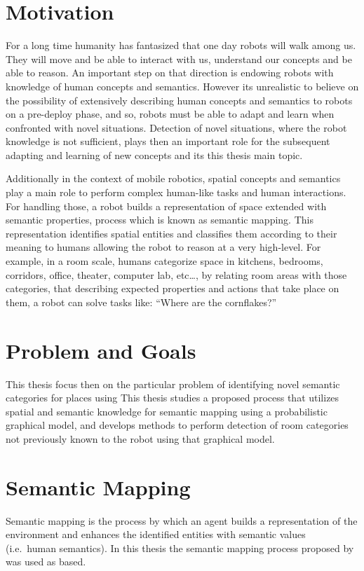 \documentclass[9pt,a4paper]{extarticle}
\begin{document}
\begin{multicols}{2}

\section{Motivation}
For a long time humanity has fantasized that one day robots will walk among us.
They will move and be able to interact with us, understand our concepts and
be able to reason.
An important step on that direction is endowing robots with knowledge of human concepts and
semantics. However its unrealistic to believe on the possibility of extensively
describing human concepts and semantics to robots on a pre-deploy phase, and so, robots must be able
to adapt and learn when confronted with novel situations.
Detection of novel situations, where the robot knowledge is not sufficient, plays then an important
role for the subsequent adapting and learning of new concepts and its this thesis main topic.

Additionally in the context of mobile robotics, spatial concepts and semantics play a main role to perform
complex human-like tasks and human interactions. For handling those, a robot builds a representation
of space extended with semantic properties, process which is known as semantic mapping.
This representation identifies spatial entities and classifies them according to their meaning to
humans allowing the robot to reason at a very high-level.
For example, in a room scale, humans categorize space in kitchens, bedrooms, corridors,
office, theater, computer lab, etc\dots, by relating room areas with those categories, that describing expected
properties and actions that take place on them, a robot can solve tasks like:
``Where are the cornflakes?''

\section{Problem and Goals}
This thesis focus then on the particular problem of identifying novel semantic categories for places
using
This thesis studies a proposed %
process that utilizes spatial and semantic knowledge for semantic mapping using a
probabilistic graphical model,
and develops methods to perform detection of room categories not previously
known to the robot using that graphical model.

\section{Semantic Mapping}
Semantic mapping is the process by which an agent builds a representation of the environment and
enhances the identified entities with semantic values (i.e.\ human semantics).
In this thesis the semantic mapping process proposed by \cite{pronobis2011phd} was used as based.


\end{multicols}
\end{document}
